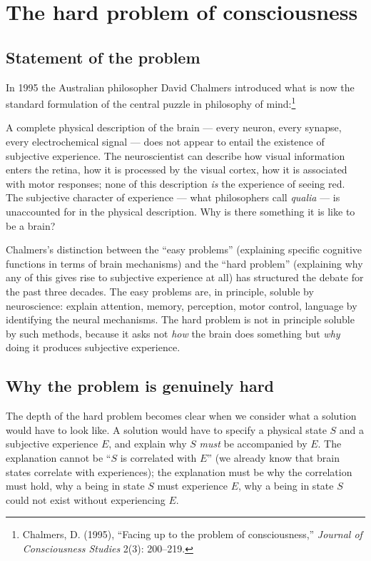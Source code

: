 \section{The hard problem of consciousness}
\label{sec:hard-problem}

\subsection{Statement of the problem}

In 1995 the Australian philosopher David Chalmers introduced what is
now the standard formulation of the central puzzle in philosophy of
mind:\footnote{Chalmers, D. (1995), ``Facing up to the problem of
consciousness,'' \emph{Journal of Consciousness Studies} 2(3):
200--219.}

\begin{conceptbox}
\label{conc:hard-problem}
A complete physical description of the brain ---
every neuron, every synapse, every electrochemical signal --- does
not appear to entail the existence of subjective experience. The
neuroscientist can describe how visual information enters the
retina, how it is processed by the visual cortex, how it is
associated with motor responses; none of this description \emph{is}
the experience of seeing red. The subjective character of
experience --- what philosophers call \emph{qualia} --- is
unaccounted for in the physical description. Why is there
something it is like to be a brain?
\end{conceptbox}

Chalmers's distinction between the ``easy problems'' (explaining
specific cognitive functions in terms of brain mechanisms) and the
``hard problem'' (explaining why any of this gives rise to
subjective experience at all) has structured the debate for the
past three decades. The easy problems are, in principle, soluble by
neuroscience: explain attention, memory, perception, motor control,
language by identifying the neural mechanisms. The hard problem is
not in principle soluble by such methods, because it asks not
\emph{how} the brain does something but \emph{why} doing it produces
subjective experience.

\subsection{Why the problem is genuinely hard}

The depth of the hard problem becomes clear when we consider what a
solution would have to look like. A solution would have to specify a
physical state $S$ and a subjective experience $E$, and explain why
$S$ \emph{must} be accompanied by $E$. The explanation cannot be
``$S$ is correlated with $E$'' (we already know that brain states
correlate with experiences); the explanation must be why the
correlation must hold, why a being in state $S$ must experience $E$,
why a being in state $S$ could not exist without experiencing $E$.

